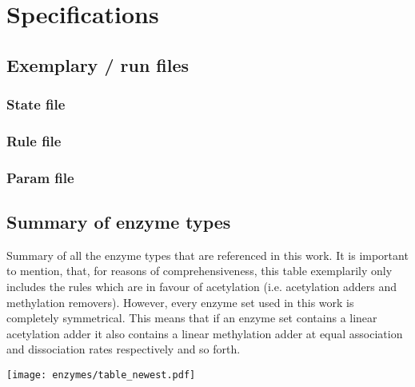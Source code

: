 \chapter{Specifications}
    \label{app:RunSpec}

    \section{Exemplary \ed/ run files}
        \subsection{State file}
            \label{app:statefile}
            
        \subsection{Rule file}
            \label{app:rulefile}
            
        \subsection{Param file}
            \label{app:paramfile}
            

    \newpage
    \section{Summary of enzyme types}

        \begin{table}[htbp!]
            \caption{Summary of all the enzyme types that are referenced in this work. It is important to mention, that, for reasons of comprehensiveness, this table exemplarily only includes the rules which are in favour of acetylation (i.e. acetylation adders and methylation removers). However, every enzyme set used in this work is completely symmetrical. This means that if an enzyme set contains a linear acetylation adder it also contains a linear methylation adder at equal association and dissociation rates respectively and so forth.}
            \texttt{[image: enzymes/table\_newest.pdf]}
            \label{img:enzymeTypeSummary}
        \end{table}

